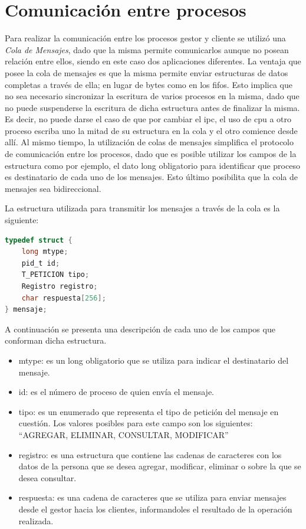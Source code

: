 \documentclass[11pt]{article}
\begin{document}
\section {Comunicaci\'on entre procesos}

Para realizar la comunicaci\'on entre los procesos gestor y cliente se utiliz\'o una \textit{Cola de Mensajes}, dado que la misma permite comunicarlos 
aunque no posean relaci\'on entre ellos, siendo en este caso dos aplicaciones diferentes. La ventaja que posee la 
cola de mensajes es que la misma permite enviar estructuras de datos completas a trav\'es de ella; en lugar de bytes como en los fifos.
Esto implica que no sea necesario sincronizar la escritura de varios procesos en la misma, dado que no puede suspenderse la escritura 
de dicha estructura antes de finalizar la misma. Es decir, no puede darse el caso de que por cambiar el ipc, el uso de cpu a otro proceso escriba uno la mitad de su estructura 
en la cola y el otro comience desde allí.
Al mismo tiempo, la utilizaci\'on de colas de mensajes simplifica el protocolo de comunicaci\'on entre los procesos, dado que es posible utilizar los campos de la estructura 
como por ejemplo, el dato long obligatorio para identificar que proceso es destinatario de cada uno de los mensajes. Esto último posibilita que la cola de mensajes sea bidireccional.

La estructura utilizada para transmitir los mensajes a trav\'es de la cola es la siguiente:

\begin{lstlisting}[language=C]
 typedef struct {
	long mtype;
	pid_t id;
	T_PETICION tipo;
	Registro registro;
	char respuesta[256];
} mensaje;
\end{lstlisting}

A continuaci\'on se presenta una descripci\'on de cada uno de los campos que conforman dicha estructura.
\begin{itemize}
\item mtype: es un long obligatorio que se utiliza para indicar el destinatario del mensaje.
\item id: es el n\'umero de proceso de quien env\'ia el mensaje.
\item tipo: es un enumerado que representa el tipo de petici\'on del mensaje en cuesti\'on. 
Los valores posibles para este campo son los siguientes: ``AGREGAR, ELIMINAR, CONSULTAR, MODIFICAR''
\item registro: es una estructura que contiene las cadenas de caracteres con los datos de la persona que se desea agregar, modificar, eliminar o sobre la que 
se desea consultar.
\item respuesta: es una cadena de caracteres que se utiliza para enviar mensajes desde el gestor hacia los clientes, 
informandoles el resultado de la operaci\'on realizada.
\end{itemize}
\end{document}
